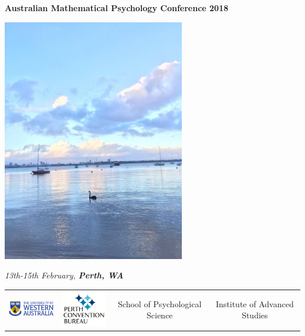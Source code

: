 \documentclass[]{article}
\title{}
\author{}
\date{}
\begin{document}
\begin{center}
\Huge
{\bf Australian Mathematical Psychology Conference 2018}    
\vspace{3 cm}
\end{center}

\begin{center}
\includegraphics[width=8cm]{images/River}
\vspace{0.5 cm}
\end{center}

\begin{center}
\Large {\it 13th-15th February, \bf Perth, WA}
\end{center}

\renewcommand{\arraystretch}{1.5}

\begin{center}
\begin{table}[b]
\begin{tabular}{cccc}
\includegraphics[width=3cm]{images/UWA-Full-Hor-CMYK.png}&
\includegraphics[width=3cm]{images/PCB.png}&
School of Psychological Science &
Institute of Advanced Studies
\end{tabular}
\end{table}
\end{center}\newpage
\end{document}
